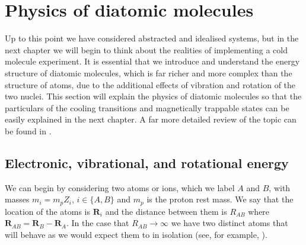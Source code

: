 \section{Physics of diatomic molecules}
\label{theory:molecules}

Up to this point we have considered abstracted and idealised systems, but in
the next chapter we will begin to think about the realities of implementing a
cold molecule experiment. It is essential that we introduce and understand the
energy structure of diatomic molecules, which is far richer and more complex
than the structure of atoms, due to the additional effects of vibration and
rotation of the two nuclei. This section will explain the physics of diatomic
molecules so that the particulars of the cooling transitions and magnetically
trappable states can be easily explained in the next chapter. A far more
detailed review of the topic can be found in .

\subsection{Electronic, vibrational, and rotational energy}

We can begin by considering two atoms or ions, which we label $A$ and $B$,
with masses  $m_i = m_p Z_i$, $i\in\{A,B\}$ and $m_p$ is the proton rest mass. We say that the location of the
atoms is $\mathbf{R}_i$ and the distance between them is
$R_{AB}$ where $\mathbf{R}_{AB} = \mathbf{R}_B - \mathbf{R}_A$. In the case
that $R_{AB} \rightarrow \infty$ we have two distinct atoms that will behave 
as we would expect them to in isolation (see, for example,
).

